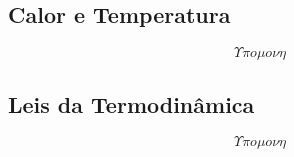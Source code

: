 \subsection{Calor e Temperatura}
    \[ \Upsilon \pi o \mu o \nu \eta \]
\subsection{Leis da Termodinâmica}
    \[ \Upsilon \pi o \mu o \nu \eta \]